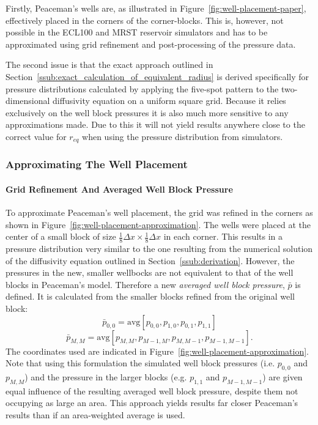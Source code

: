 Firstly, Peaceman's wells are, as illustrated in Figure~\ref{fig:well-placement-paper}, effectively placed in the corners of the corner-blocks. This is, however, not possible in the ECL100 and MRST reservoir simulators and has to be approximated using grid refinement and post-processing of the pressure data.

The second issue is that the exact approach outlined in Section~\ref{ssub:exact_calculation_of_equivalent_radius} is derived specifically for pressure distributions calculated by applying the five-spot pattern to the two-dimensional diffusivity equation on a uniform square grid. Because it relies exclusively on the well block pressures it is also much more sensitive to any approximations made. Due to this it will not yield results anywhere close to the correct value for $r_{eq}$ when using the pressure distribution from simulators.

\subsubsection{Approximating The Well Placement} %
\label{ssub:approximating_the_well_placement}

\paragraph{Grid Refinement And Averaged Well Block Pressure} %
\label{par:grid_refinement_and_averaged_well_block_pressure}
To approximate Peaceman's well placement, the grid was refined in the corners as shown in Figure~\ref{fig:well-placement-approximation}. The wells were placed at the center of a small block of size $\frac{1}{8}\Delta x\times \frac{1}{8}\Delta x$ in each corner. This results in a pressure distribution very similar to the one resulting from the numerical solution of the diffusivity equation outlined in Section~\ref{ssub:derivation}. However, the pressures in the new, smaller wellbocks are not equivalent to that of the well blocks in Peaceman's model. Therefore a new \emph{averaged well block pressure}, $\bar{p}$ is defined. It is calculated from the smaller blocks refined from the original well block:
\begin{equation}
    \bar{p}_{0,0} = \mathrm{avg}\left[ p_{0,0}, p_{1,0}, p_{0,1}, p_{1,1} \right]
\end{equation}
\begin{equation}
    \bar{p}_{M,M} = \mathrm{avg}\left[ p_{M,M}, p_{M-1,M}, p_{M,M-1}, p_{M-1,M-1} \right].
\end{equation}
The coordinates used are indicated in Figure~\ref{fig:well-placement-approximation}. Note that using this formulation the simulated well block pressures (i.e. $p_{0,0}$ and $p_{M,M}$) and the pressure in the larger blocks (e.g. $p_{1,1}$ and $p_{M-1,M-1}$) are given equal influence of the resulting averaged well block pressure, despite them not occupying as large an area.  This approach yields results far closer Peaceman's results than if an area-weighted average is used.

